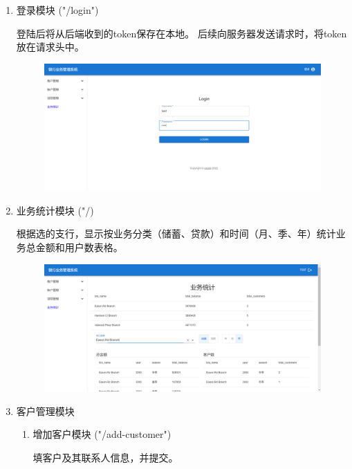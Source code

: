 \documentclass{ctexart}
\begin{document}
\begin{enumerate}
    \item 登录模块 ("/login")
    
    登陆后将从后端收到的token保存在本地。 后续向服务器发送请求时，将token放在请求头中。

    \begin{figure}[H]
        \centering
        \includegraphics[width=\textwidth]{assets/images/login.png}
    \end{figure}

    \item 业务统计模块 ("/)
    
    根据选的支行，显示按业务分类（储蓄、贷款）和时间（月、季、年）统计业务总金额和用户数表格。

    \begin{figure}[H]
        \centering
        \includegraphics[width=\textwidth]{assets/images/dashboard.png}
    \end{figure}

    
    \item 客户管理模块
    
    \begin{enumerate}
        \item 增加客户模块 ("/add-customer")
        
        填客户及其联系人信息，并提交。


\end{enumerate}
\end{enumerate}
\end{document}
